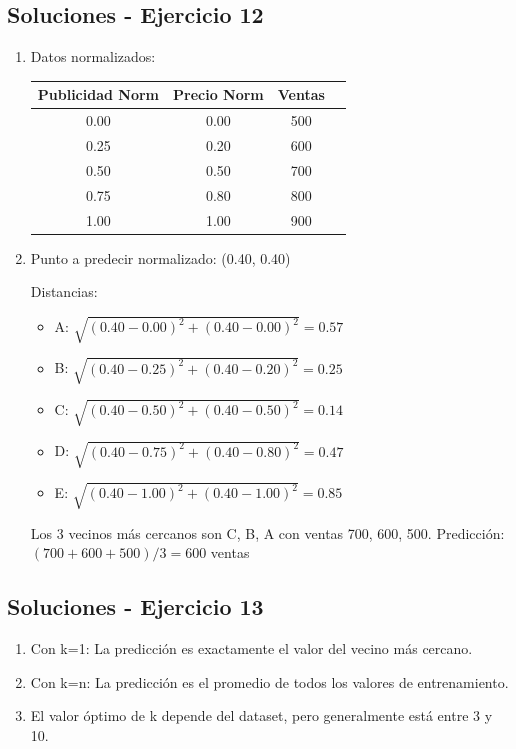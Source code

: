 \documentclass[12pt]{article}
\begin{document}
\subsection{Soluciones - Ejercicio 12}

\begin{enumerate}
    \item Datos normalizados:
    \begin{table}[H]
        \centering
        \begin{tabular}{cccc}
            \toprule
            \textbf{Publicidad Norm} & \textbf{Precio Norm} & \textbf{Ventas} \\
            \midrule
            0.00 & 0.00 & 500 \\
            0.25 & 0.20 & 600 \\
            0.50 & 0.50 & 700 \\
            0.75 & 0.80 & 800 \\
            1.00 & 1.00 & 900 \\
            \bottomrule
        \end{tabular}
    \end{table}
    
    \item Punto a predecir normalizado: (0.40, 0.40)
    
    Distancias:
    \begin{itemize}
        \item A: $\sqrt{(0.40-0.00)^2 + (0.40-0.00)^2} = 0.57$
        \item B: $\sqrt{(0.40-0.25)^2 + (0.40-0.20)^2} = 0.25$
        \item C: $\sqrt{(0.40-0.50)^2 + (0.40-0.50)^2} = 0.14$
        \item D: $\sqrt{(0.40-0.75)^2 + (0.40-0.80)^2} = 0.47$
        \item E: $\sqrt{(0.40-1.00)^2 + (0.40-1.00)^2} = 0.85$
    \end{itemize}
    
    Los 3 vecinos más cercanos son C, B, A con ventas 700, 600, 500.
    Predicción: $(700 + 600 + 500) / 3 = 600$ ventas
\end{enumerate}

\subsection{Soluciones - Ejercicio 13}

\begin{enumerate}
    \item Con k=1: La predicción es exactamente el valor del vecino más cercano.
    \item Con k=n: La predicción es el promedio de todos los valores de entrenamiento.
    \item El valor óptimo de k depende del dataset, pero generalmente está entre 3 y 10.
\end{enumerate}
\end{document}
